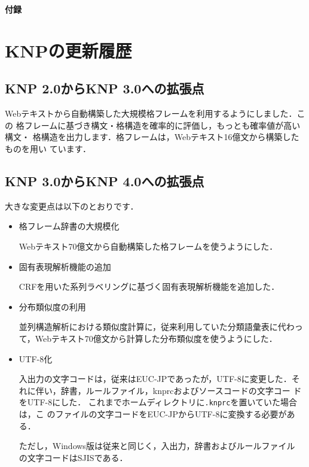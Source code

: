 \documentclass[a4j,11pt,titlepage]{jarticle}
\begin{document}
\clearpage


\noindent
{\LARGE\bf 付録}

\appendix

\section{KNPの更新履歴}

\subsection{KNP 2.0からKNP 3.0への拡張点}

Webテキストから自動構築した大規模格フレームを利用するようにしました．この
格フレームに基づき構文・格構造を確率的に評価し，もっとも確率値が高い構文・
格構造を出力します．格フレームは，Webテキスト16億文から構築したものを用い
ています．


\subsection{KNP 3.0からKNP 4.0への拡張点}

大きな変更点は以下のとおりです．
\begin{itemize}
 \item 格フレーム辞書の大規模化

       Webテキスト70億文から自動構築した格フレームを使うようにした．

 \item 固有表現解析機能の追加

       CRFを用いた系列ラベリングに基づく固有表現解析機能を追加した．

 \item 分布類似度の利用

       並列構造解析における類似度計算に，従来利用していた分類語彙表に代わっ
       て，Webテキスト70億文から計算した分布類似度を使うようにした．

 \item UTF-8化

       入出力の文字コードは，従来はEUC-JPであったが，UTF-8に変更した．そ
       れに伴い，辞書，ルールファイル，knprcおよびソースコードの文字コー
       ドをUTF-8にした．
       これまでホームディレクトリに\texttt{.knprc}を置いていた場合は，こ
       のファイルの文字コードをEUC-JPからUTF-8に変換する必要がある．

       ただし，Windows版は従来と同じく，入出力，辞書およびルールファイル
       の文字コードはSJISである．
\end{itemize}
\end{document}
